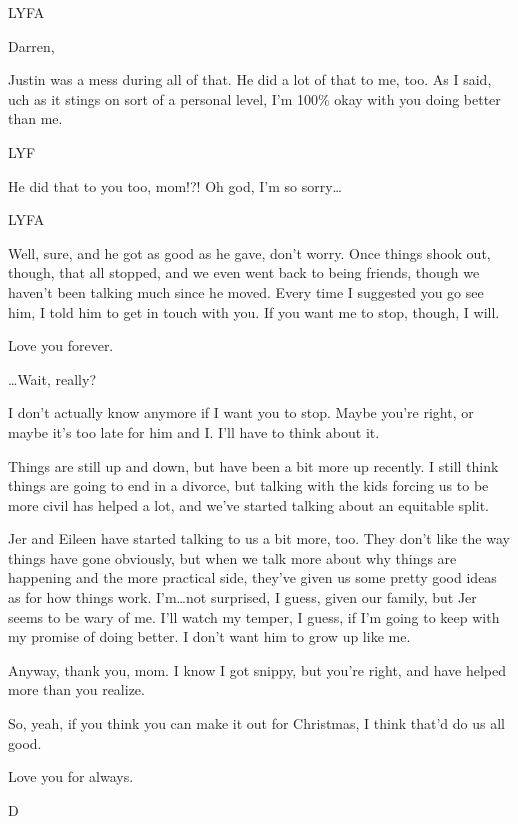 LYFA

\secdiv{}\newpage

Darren,

Justin was a mess during all of that. He did a lot of that to me, too. As I said, uch as it stings on sort of a personal level, I'm 100\% okay with you doing better than me.

LYF

\secdiv{}

He did that to you too, mom!?! Oh god, I'm so sorry\ldots{}

LYFA

\secdiv{}

Well, sure, and he got as good as he gave, don't worry. Once things shook out, though, that all stopped, and we even went back to being friends, though we haven't been talking much since he moved. Every time I suggested you go see him, I told him to get in touch with you. If you want me to stop, though, I will.

Love you forever.

\secdiv{}

\ldots{}Wait, really?

I don't actually know anymore if I want you to stop. Maybe you're right, or maybe it's too late for him and I. I'll have to think about it.

Things are still up and down, but have been a bit more up recently. I still think things are going to end in a divorce, but talking with the kids forcing us to be more civil has helped a lot, and we've started talking about an equitable split.\newpage

Jer and Eileen have started talking to us a bit more, too. They don't like the way things have gone obviously, but when we talk more about why things are happening and the more practical side, they've given us some pretty good ideas as for how things work. I'm\ldots{}not surprised, I guess, given our family, but Jer seems to be wary of me. I'll watch my temper, I guess, if I'm going to keep with my promise of doing better. I don't want him to grow up like me.

Anyway, thank you, mom. I know I got snippy, but you're right, and have helped more than you realize.

So, yeah, if you think you can make it out for Christmas, I think that'd do us all good.

Love you for always.

D
